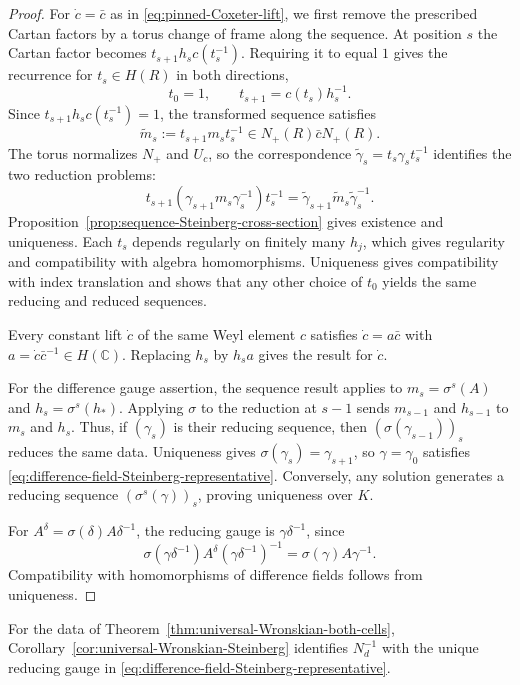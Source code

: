 \documentclass[11pt,leqno]{amsart}
\numberwithin{equation}{section}
\theoremstyle{plain}
\theoremstyle{definition}
\theoremstyle{plain}
\theoremstyle{definition}
\theoremstyle{remark}
\begin{document}
\begin{proof}
For $\dot c=\bar c$ as in \eqref{eq:pinned-Coxeter-lift}, we first remove the prescribed Cartan factors by a torus change of frame along the sequence. At position $s$ the Cartan factor becomes $t_{s+1}h_sc(t_s^{-1})$. Requiring it to equal $1$ gives the recurrence for $t_s\in H(R)$ in both directions,
\begin{equation}\label{eq:weighted-Cartan-sequence}
 t_0=1,\qquad t_{s+1}=c(t_s)h_s^{-1}.
\end{equation}
Since $t_{s+1}h_sc(t_s^{-1})=1$, the transformed sequence satisfies
\[
 \widetilde m_s:=t_{s+1}m_st_s^{-1}
       \in N_+(R)\bar cN_+(R).
\]
The torus normalizes $N_+$ and $U_c$, so the correspondence $\widetilde\gamma_s=t_s\gamma_st_s^{-1}$ identifies the two reduction problems:
\[
 t_{s+1}(\gamma_{s+1}m_s\gamma_s^{-1})t_s^{-1}
 =\widetilde\gamma_{s+1}\widetilde m_s\widetilde\gamma_s^{-1}.
\]
Proposition~\ref{prop:sequence-Steinberg-cross-section} gives existence and uniqueness.  Each $t_s$ depends regularly on finitely many $h_j$, which gives regularity and compatibility with algebra homomorphisms.  Uniqueness gives compatibility with index translation and shows that any other choice of $t_0$ yields the same reducing and reduced sequences.

Every constant lift $\dot c$ of the same Weyl element $c$ satisfies $\dot c=a\bar c$ with $a=\dot c\bar c^{-1}\in H(\mathbb C)$.  Replacing $h_s$ by $h_sa$ gives the result for $\dot c$.

For the difference gauge assertion, the sequence result applies to $m_s=\sigma^s(A)$ and $h_s=\sigma^s(h_*)$.  Applying $\sigma$ to the reduction at $s-1$ sends $m_{s-1}$ and $h_{s-1}$ to $m_s$ and $h_s$. Thus, if $(\gamma_s)$ is their reducing sequence, then $(\sigma(\gamma_{s-1}))_s$ reduces the same data.  Uniqueness gives $\sigma(\gamma_s)=\gamma_{s+1}$, so $\gamma=\gamma_0$ satisfies \eqref{eq:difference-field-Steinberg-representative}.  Conversely, any solution generates a reducing sequence $(\sigma^s(\gamma))_s$, proving uniqueness over $K$.

For $A^\delta=\sigma(\delta)A\delta^{-1}$, the reducing gauge is $\gamma\delta^{-1}$, since
\[
 \sigma(\gamma\delta^{-1})A^\delta(\gamma\delta^{-1})^{-1}
 =\sigma(\gamma)A\gamma^{-1}.
\]
Compatibility with homomorphisms of difference fields follows from uniqueness.
\end{proof}

For the data of Theorem~\ref{thm:universal-Wronskian-both-cells}, Corollary~\ref{cor:universal-Wronskian-Steinberg} identifies $N_d^{-1}$ with the unique reducing gauge in \eqref{eq:difference-field-Steinberg-representative}.
\end{document}
